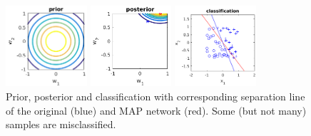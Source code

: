 \documentclass[pdftex,11pt,a4paper]{article}
\begin{document}
\begin{figure}[htb]
\centering
\begin{minipage}{0.2\textwidth}
\includegraphics[height=3cm]{figs/prior_contour.png}
\end{minipage}%
\begin{minipage}{0.2\textwidth}
\includegraphics[height=3cm]{figs/posterior_contour.png}
\end{minipage}%
\begin{minipage}{0.2\textwidth}
\includegraphics[height=3cm]{figs/separation_line.png}
\end{minipage}%
\caption{Prior, posterior and classification with corresponding separation line of the original (blue) and MAP network (red). Some (but not many) samples are misclassified.\label{fig:example_perbayes}}
\end{figure}
\end{document}

